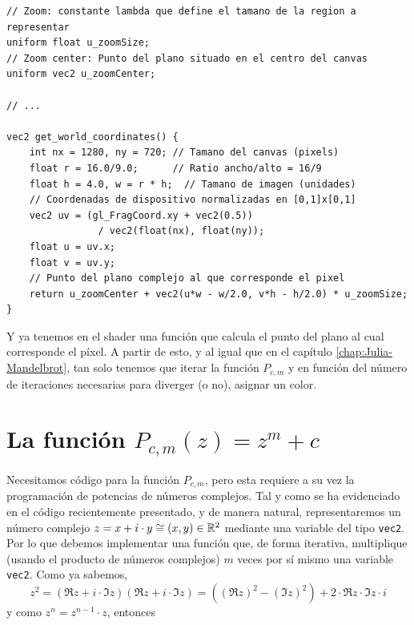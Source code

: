 \begin{lstlisting}
// Zoom: constante lambda que define el tamano de la region a representar
uniform float u_zoomSize;
// Zoom center: Punto del plano situado en el centro del canvas
uniform vec2 u_zoomCenter;

// ... 

vec2 get_world_coordinates() {
    int nx = 1280, ny = 720; // Tamano del canvas (pixels)
    float r = 16.0/9.0;      // Ratio ancho/alto = 16/9
    float h = 4.0, w = r * h;  // Tamano de imagen (unidades) 
    // Coordenadas de dispositivo normalizadas en [0,1]x[0,1]
    vec2 uv = (gl_FragCoord.xy + vec2(0.5)) 
                / vec2(float(nx), float(ny));
    float u = uv.x;
    float v = uv.y;
    // Punto del plano complejo al que corresponde el pixel
    return u_zoomCenter + vec2(u*w - w/2.0, v*h - h/2.0) * u_zoomSize;
}
\end{lstlisting}


Y ya tenemos en el shader una función que calcula el punto del plano al cual corresponde el píxel. A partir de esto, y al igual que en el capítulo \ref{chap:Julia-Mandelbrot}, tan solo tenemos que iterar la función $P_{c,m}$ y en función del número de iteraciones necesarias para diverger (o no), asignar un color.

\section{La función $P_{c,m}(z)=z^m+c$}

Necesitamos código para la función $P_{c,m}$, pero esta requiere a su vez la programación de potencias de números complejos. Tal y como se ha evidenciado en el código recientemente presentado, y de manera natural, representaremos un número complejo $z=x+i\cdot y\cong (x,y)\in\mathbb{R}^2$ mediante una variable del tipo \verb|vec2|. Por lo que debemos implementar una función que, de forma iterativa, multiplique (usando el producto de números complejos) $m$ veces por sí mismo una variable \verb|vec2|. Como ya sabemos,
$$
z^2 = (\Re z+i\cdot \Im z)(\Re z+i\cdot \Im z) = ((\Re z)^2-(\Im z)^2) + 2\cdot\Re z\cdot\Im z\cdot i
$$
y como $z^n = z^{n-1}\cdot z$, entonces

